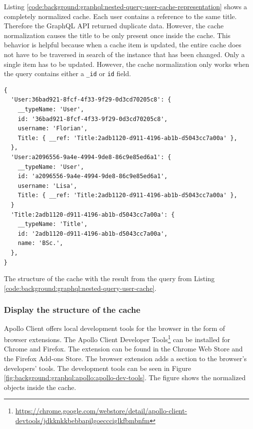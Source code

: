 \bigskip

\noindent Listing \ref{code:background:graphql:nested-query-user-cache-representation} shows a completely normalized cache. Each user contains a reference to the same title. Therefore the GraphQL \ac{API} returned duplicate data. However, the cache normalization causes the title to be only present once inside the cache. This behavior is helpful because when a cache item is updated, the entire cache does not have to be traversed in search of the instance that has been changed. Only a single item has to be updated. However, the cache normalization only works when the query contains either a \texttt{\_id} or \texttt{id} field.

\ifshowListings
\begin{listing}[H]
  \begin{verbatim}
{
  'User:36bad921-8fcf-4f33-9f29-0d3cd70205c8': {
    __typeName: 'User',
    id: '36bad921-8fcf-4f33-9f29-0d3cd70205c8',
    username: 'Florian',
    Title: { __ref: 'Title:2adb1120-d911-4196-ab1b-d5043cc7a00a' },
  },
  'User:a2096556-9a4e-4994-9de8-86c9e85ed6a1': {
    __typeName: 'User',
    id: 'a2096556-9a4e-4994-9de8-86c9e85ed6a1',
    username: 'Lisa',
    Title: { __ref: 'Title:2adb1120-d911-4196-ab1b-d5043cc7a00a' },
  }
  'Title:2adb1120-d911-4196-ab1b-d5043cc7a00a': {
    __typeName: 'Title',
    id: '2adb1120-d911-4196-ab1b-d5043cc7a00a',
    name: 'BSc.',
  },
}
  \end{verbatim}
  \caption{The structure of the cache with the result from the query from Listing \ref{code:background:graphql:nested-query-user-cache}.}\label{code:background:graphql:nested-query-user-cache-representation}
\end{listing}
\fi

\subsubsection{Display the structure of the cache}\label{subsubsection:background:graphql:apollo-server-client:understanding-cache-structure}

Apollo Client offers local development tools for the browser in the form of browser extensions. The Apollo Client Developer Tools\footnote{\url{https://chrome.google.com/webstore/detail/apollo-client-devtools/jdkknkkbebbapilgoeccciglkfbmbnfm}} can be installed for Chrome and Firefox. The extension can be found in the Chrome Web Store and the Firefox Add-ons Store. The browser extension adds a section to the browser's developers' tools. \cite{misc:-:background:graphql:apollo-developer-tools} The development tools can be seen in Figure \ref{fig:background:graphql:apollo:apollo-dev-tools}. The figure shows the normalized objects inside the cache.

